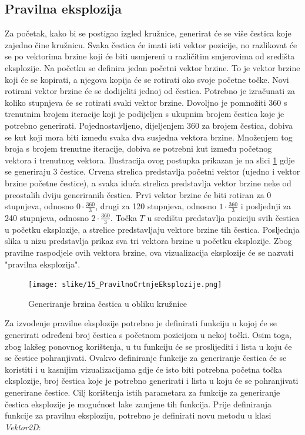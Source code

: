 \documentclass{foi}
\begin{document}
\subsection{Pravilna eksplozija}
Za početak, kako bi se postigao izgled kružnice, generirat će se više čestica koje zajedno čine kružnicu. Svaka čestica će imati isti vektor pozicije, no razlikovat će se po vektorima brzine koji će biti usmjereni u različitim smjerovima od središta eksplozije. Na početku se definira jedan početni vektor brzine. To je vektor brzine koji će se kopirati, a njegova kopija će se rotirati oko svoje početne točke. Novi rotirani vektor brzine će se dodijeliti jednoj od čestica. Potrebno je izračunati za koliko stupnjeva će se rotirati svaki vektor brzine. Dovoljno je pomnožiti 360 s trenutnim brojem iteracije koji je podijeljen s ukupnim brojem čestica koje je potrebno generirati. Pojednostavljeno, dijeljenjem 360 za brojem čestica, dobiva se kut koji mora biti između svaka dva susjedna vektora brzine. Množenjem tog broja s brojem trenutne iteracije, dobiva se potrebni kut između početnog vektora i trenutnog vektora. Ilustracija ovog postupka prikazan je na slici \ref{fig:PravilnoCrtnjeEksplozije} gdje se generiraju 3 čestice. Crvena strelica predstavlja početni vektor (ujedno i vektor brzine početne čestice), a svaka iduća strelica predstavlja vektor brzine neke od preostalih dviju generiranih čestica. Prvi vektor brzine će biti rotiran za 0 stupnjeva, odnosno $0 \cdot \frac{360}{3}$, drugi za 120 stupnjeva, odnosno $1 \cdot \frac{360}{3}$ i posljednji za 240 stupnjeva, odnosno $2 \cdot \frac{360}{3}$. Točka $T$ u središtu predstavlja poziciju svih čestica u početku eksplozije, a strelice predstavljaju vektore brzine tih čestica. Posljednja slika u nizu predstavlja prikaz sva tri vektora brzine u početku eksplozije. Zbog pravilne raspodjele ovih vektora brzine, ova vizualizacija eksplozije će se nazvati "pravilna eksplozija".

\begin{figure}[H]
    \centering
    \texttt{[image: slike/15\_PravilnoCrtnjeEksplozije.png]}
    \captionsetup{justification=centering}
    \caption{Generiranje brzina čestica u obliku kružnice}
\label{fig:PravilnoCrtnjeEksplozije}
\end{figure}

Za izvođenje pravilne eksplozije potrebno je definirati funkciju u kojoj će se generirati određeni broj čestica s početnom pozicijom u nekoj točki. Osim toga, zbog lakšeg ponovnog korištenja, u tu funkciju će se proslijediti i lista u koju će se čestice pohranjivati. Ovakvo definiranje funkcije za generiranje čestica će se koristiti i u kasnijim vizualizacijama gdje će isto biti potrebna početna točka eksplozije, broj čestica koje je potrebno generirati i lista u koju će se pohranjivati generirane čestice. Cilj korištenja istih parametara za funkcije za generiranje čestica eksplozije je mogućnost lake zamjene tih funkcija. Prije definiranja funkcije za pravilnu eksploziju, potrebno je definirati novu metodu u klasi \textit{Vektor2D}:
\end{document}
